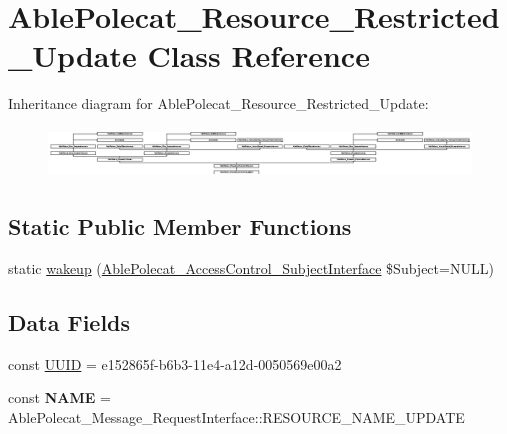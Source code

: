 \hypertarget{class_able_polecat___resource___restricted___update}{}\section{Able\+Polecat\+\_\+\+Resource\+\_\+\+Restricted\+\_\+\+Update Class Reference}
\label{class_able_polecat___resource___restricted___update}
Inheritance diagram for Able\+Polecat\+\_\+\+Resource\+\_\+\+Restricted\+\_\+\+Update\+:\begin{figure}[H]
\begin{center}
\leavevmode
\includegraphics[height=1.327913cm]{class_able_polecat___resource___restricted___update}
\end{center}
\end{figure}
\subsection*{Static Public Member Functions}
\begin{DoxyCompactItemize}
\item 
static \hyperlink{class_able_polecat___resource___restricted___update_a3f2135f6ad45f51d075657f6d20db2cd}{wakeup} (\hyperlink{interface_able_polecat___access_control___subject_interface}{Able\+Polecat\+\_\+\+Access\+Control\+\_\+\+Subject\+Interface} \$Subject=N\+U\+L\+L)
\end{DoxyCompactItemize}
\subsection*{Data Fields}
\begin{DoxyCompactItemize}
\item 
const \hyperlink{class_able_polecat___resource___restricted___update_a74b892c8c0b86bf9d04c5819898c51e7}{U\+U\+I\+D} = \textquotesingle{}e152865f-\/b6b3-\/11e4-\/a12d-\/0050569e00a2\textquotesingle{}
\item 
\hypertarget{class_able_polecat___resource___restricted___update_a244352f035b82b20b0efa506167fd862}{}const {\bfseries N\+A\+M\+E} = Able\+Polecat\+\_\+\+Message\+\_\+\+Request\+Interface\+::\+R\+E\+S\+O\+U\+R\+C\+E\+\_\+\+N\+A\+M\+E\+\_\+\+U\+P\+D\+A\+T\+E\label{class_able_polecat___resource___restricted___update_a244352f035b82b20b0efa506167fd862}

\end{DoxyCompactItemize}
